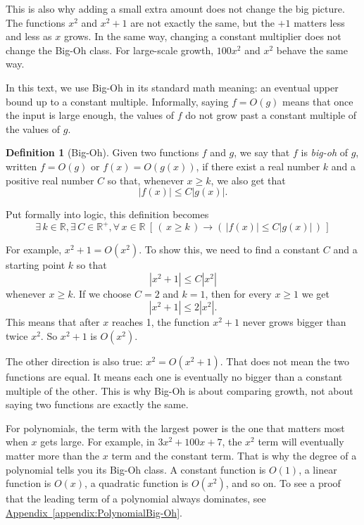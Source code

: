 \documentclass[11pt,oneside]{book}
\theoremstyle{definition}
\newtheorem{defn}[thm]{Definition}
\begin{document}
This is also why adding a small extra amount does not change the big picture.
The functions $x^{2}$ and $x^{2} + 1$ are not exactly the same, but the $+1$ matters less and less as $x$ grows.
In the same way, changing a constant multiplier does not change the Big-Oh class.
For large-scale growth, $100x^{2}$ and $x^{2}$ behave the same way.

In this text, we use Big-Oh in its standard math meaning: an eventual upper bound up to a constant multiple.
Informally, saying $f = O(g)$ means that once the input is large enough, the values of $f$ do not grow past a constant multiple of the values of $g$.

\begin{defn}[Big-Oh] \label{defn:Big-Oh}
    Given two functions $f$ and $g$, we say that $f$ is \emph{big-oh} of $g$, written $f = O(g)$ or $f(x) = O(g(x))$, if there exist a real number $k$ and a positive real number $C$ so that, whenever $x \geq k$, we also get that
    \[ |f(x)| \leq C|g(x)|. \]
\end{defn}

Put formally into logic, this definition becomes
\begin{equation} \exists\, k \in \mathbb{R}, \exists\, C \in \mathbb{R}^{+}, \forall\, x \in \mathbb{R}\ [\, (\, x \geq k\, ) \rightarrow (\, |f(x)| \leq C|g(x)|\, )\, ] \label{eq:Big-Oh} \end{equation}

For example, $x^{2} + 1 = O(x^{2})$.
To show this, we need to find a constant $C$ and a starting point $k$ so that
\[ |x^{2} + 1| \leq C|x^{2}| \]
whenever $x \geq k$.
If we choose $C = 2$ and $k = 1$, then for every $x \geq 1$ we get
\[ |x^{2} + 1| \leq 2|x^{2}|. \]
This means that after $x$ reaches 1, the function $x^{2} + 1$ never grows bigger than twice $x^{2}$.
So $x^{2} + 1$ is $O(x^{2})$.

The other direction is also true: $x^{2} = O(x^{2} + 1)$.
That does not mean the two functions are equal.
It means each one is eventually no bigger than a constant multiple of the other.
This is why Big-Oh is about comparing growth, not about saying two functions are exactly the same.

For polynomials, the term with the largest power is the one that matters most when $x$ gets large.
For example, in $3x^{2} + 100x + 7$, the $x^{2}$ term will eventually matter more than the $x$ term and the constant term.
That is why the degree of a polynomial tells you its Big-Oh class.
A constant function is $O(1)$, a linear function is $O(x)$, a quadratic function is $O(x^{2})$, and so on.
To see a proof that the leading term of a polynomial always dominates, see \hyperref[appendix:PolynomialBig-Oh]{Appendix~\ref*{appendix:PolynomialBig-Oh}}.
\end{document}
